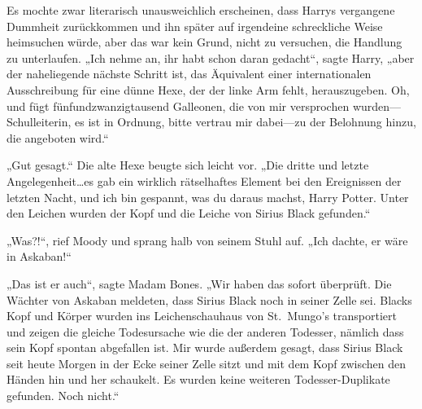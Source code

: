 Es mochte zwar literarisch unausweichlich erscheinen, dass Harrys vergangene Dummheit zurückkommen und ihn später auf irgendeine schreckliche Weise heimsuchen würde, aber das war kein Grund, nicht zu versuchen, die Handlung zu unterlaufen.
„Ich nehme an, ihr habt schon daran gedacht“, sagte Harry, „aber der naheliegende nächste Schritt ist, das Äquivalent einer internationalen Ausschreibung für eine dünne Hexe, der der linke Arm fehlt, herauszugeben. Oh, und fügt fünfundzwanzigtausend Galleonen, die von mir versprochen wurden—Schulleiterin, es ist in Ordnung, bitte vertrau mir dabei—zu der Belohnung hinzu, die angeboten wird.“

„Gut gesagt.“
Die alte Hexe beugte sich leicht vor.
„Die dritte und letzte Angelegenheit…es gab ein wirklich rätselhaftes Element bei den Ereignissen der letzten Nacht, und ich bin gespannt, was du daraus machst, Harry Potter. Unter den Leichen wurden der Kopf und die Leiche von Sirius Black gefunden.“

„Was?!“, rief Moody und sprang halb von seinem Stuhl auf. „Ich dachte, er wäre in Askaban!“

„Das ist er auch“, sagte Madam Bones. „Wir haben das sofort überprüft. Die Wächter von Askaban meldeten, dass Sirius Black noch in seiner Zelle sei. Blacks Kopf und Körper wurden ins Leichenschauhaus von St.~Mungo’s transportiert und zeigen die gleiche Todesursache wie die der anderen Todesser, nämlich dass sein Kopf spontan abgefallen ist. Mir wurde außerdem gesagt, dass Sirius Black seit heute Morgen in der Ecke seiner Zelle sitzt und mit dem Kopf zwischen den Händen hin und her schaukelt. Es wurden keine weiteren Todesser-Duplikate gefunden. Noch nicht.“

